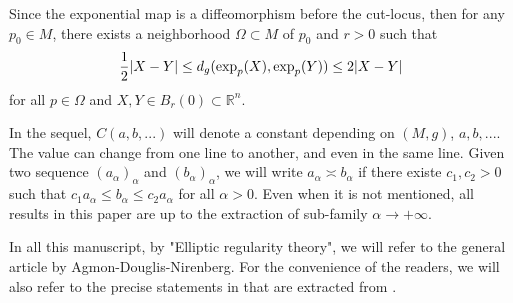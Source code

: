 \documentclass[reqno]{amsart}
\def \rn {\mathbb{R}^n}
\begin{document}
\smallskip\noindent Since the exponential map is a diffeomorphism before the cut-locus, then for any $p_0\in M$, there exists a neighborhood $\Omega\subset M$ of $p_0$ and $r>0$ such that
\begin{equation}\label{lem:lip}
\frac{1}{2}|X-Y|\leq d_g(\hbox{exp}_p(X),\hbox{exp}_p(Y))\leq 2|X-Y|
\end{equation}
for all $p\in\Omega$ and $X,Y\in B_{r}(0)\subset \rn$. 


\smallskip\noindent  In the sequel, $C(a,b,...)$ will denote a constant depending on $(M,g)$, $a,b,...$. The value can change from one line to another, and even in the same line. Given two sequence $(a_\alpha)_\alpha$ and $(b_\alpha)_\alpha$, we will write $a_\alpha\asymp b_\alpha$ if there existe $c_1,c_2>0$ such that $c_1 a_\alpha\leq b_\alpha\leq c_2 a_\alpha$ for all $\alpha>0$.  Even when it is not mentioned, all results in this paper are up to the extraction of sub-family $\alpha\to +\infty$.

\smallskip\noindent In all this manuscript, by "Elliptic regularity theory", we will refer to the general article \cite{ADN} by Agmon-Douglis-Nirenberg. For the convenience of the readers, we will also refer to the precise statements in \cite{robert:gjms} that are extracted from \cite{ADN}.
\end{document}
